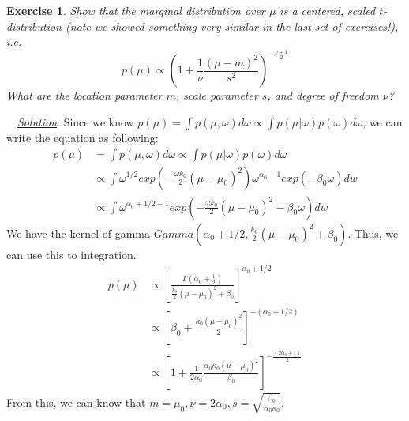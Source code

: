 \documentclass[twoside]{article}
\newcounter{lecnum}
\newtheorem{exercise}{Exercise}[lecnum]
\newenvironment{solution}{
  \begin{flushleft} \noindent ~~\underline{\emph{Solution}}: \rmfamily}{\end{flushleft}}
\begin{document}
\begin{exercise}
  Show that the marginal distribution over $\mu$ is a centered, scaled $t$-distribution (note we showed something very similar in the last set of exercises!), i.e.\
  $$p(\mu) \propto \left(1+\frac{1}{\nu}\frac{(\mu-m)^2}{s^2}\right)^{-\frac{\nu+1}{2}}$$
  What are the location parameter $m$, scale parameter $s$, and degree of freedom $\nu$?
\end{exercise}
\begin{solution}
Since we know $p(\mu) = \int p(\mu, \omega) d\omega \propto \int p(\mu| \omega)p(\omega)d\omega$, we can write the equation as following: 
\begin{equation}
\begin{split}
p(\mu) &= \int p(\mu, \omega) d\omega \propto \int p(\mu| \omega)p(\omega)d\omega
\\ &\propto \int \omega^{1/2}exp(-\frac{\omega k_0}{2}(\mu-\mu_0)^2) \omega^{\alpha_0-1}exp(-\beta_0\omega)  dw
\\ &\propto \int \omega^{\alpha_0+1/2-1}exp(-\frac{\omega k_0}{2}(\mu-\mu_0)^2 -\beta_0\omega)  dw
\end{split}
\end{equation}
We have the kernel of gamma $Gamma(\alpha_0+1/2, \frac{k_0}{2}(\mu-\mu_0)^2 +\beta_0)$. Thus, we can use this to integration.
\begin{equation}
\begin{split}
p(\mu) &\propto  [\frac{\Gamma(\alpha_0 + \frac{1}{2})}{\frac{k_0}{2}(\mu-\mu_0)^2 +\beta_0}]^{\alpha_0 + 1/2}
\\ & \propto [\beta_0 + \frac{\kappa_0(\mu - \mu_0)^2}{2}]^{-(\alpha_0 + 1/2)}
\\ & \propto [1 + \frac{1}{2\alpha_0}\frac{\alpha_0\kappa_0(\mu - \mu_0)^2}{\beta_0}]^{-\frac{(2\alpha_0 +1 )}{2}}
\end{split}
\end{equation}
From this, we can know that $m =\mu_0, \nu= 2 \alpha_0, s = \sqrt{\frac{\beta_0}{\alpha_0 \kappa_0}}$.
\end{solution}
\end{document}
